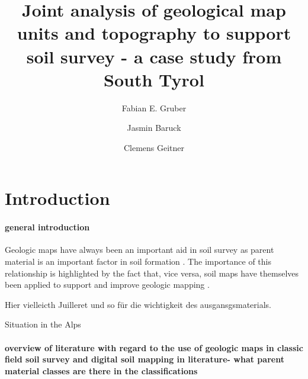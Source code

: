 \documentclass[preprint,12pt,authoryear]{elsarticle}
\begin{document}
\begin{frontmatter}

\title{Joint analysis of geological map units and topography to support soil survey - a case study from South Tyrol}



\author[mymainadress]{Fabian E. Gruber}
\author[mymainadress]{Jasmin Baruck}
\author[mymainadress]{Clemens Geitner}



\address[mymainadress]{Institute of Geography, University of Innsbruck, Innrain 52f, 6020 Innsbruck, Austria}

\begin{abstract}

\end{abstract}

\begin{keyword}

\end{keyword}

\end{frontmatter}

\linenumbers

\section{Introduction}
\paragraph{general introduction}
Geologic maps have always been an important aid in soil survey as parent material is an important factor in soil formation \citep{Jenny1941}. The importance of this relationship is highlighted by the fact that, vice versa, soil maps have themselves been applied to support and improve geologic mapping \citep{Brevik2015}. 

Hier vielleicth Juilleret und so für die wichtigkeit des ausgansgsmaterials.

Situation in the Alps

\paragraph{overview of literature with regard to the use of geologic maps in classic field soil survey and digital soil mapping in literature- what parent material classes are there in the classifications}
\end{document}
